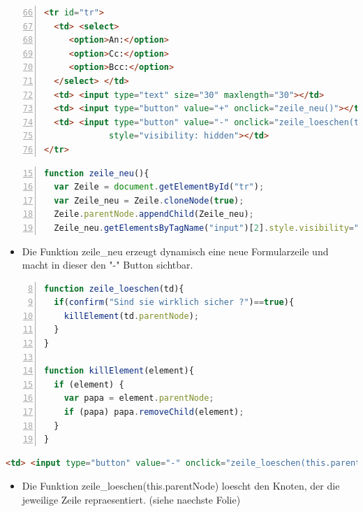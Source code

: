 \begin{frame}[<+->][fragile]
\tiny{ \begin{lstlisting}[language = HTML,
                                   mathescape = true, 
                   breaklines=true, 
                   numbers = left,
	        firstnumber=66 , 
                   numbersep = 3pt]
<tr id="tr">
  <td> <select>
     <option>An:</option>
     <option>Cc:</option>
     <option>Bcc:</option>
  </select> </td>
  <td> <input type="text" size="30" maxlength="30"></td>
  <td> <input type="button" value="+" onclick="zeile_neu()"></td>
  <td> <input type="button" value="-" onclick="zeile_loeschen(this.parentNode)" 
             style="visibility: hidden"></td>
</tr>
\end{lstlisting}}
\tiny{ \begin{lstlisting}[language=JavaScript, 
		   numbers=left,
		   numbersep=3pt,
		   firstnumber= 15,
		   breaklines=true]
function zeile_neu(){
  var Zeile = document.getElementById("tr");
  var Zeile_neu = Zeile.cloneNode(true);
  Zeile.parentNode.appendChild(Zeile_neu);
  Zeile_neu.getElementsByTagName("input")[2].style.visibility="visible";}
\end{lstlisting}}
\normalsize{
\begin{itemize}
\item Die Funktion zeile\_neu erzeugt dynamisch eine neue Formularzeile und macht in dieser den "-" Button sichtbar.
\end{itemize}
}
\end{frame}
\begin{frame}[<+->][fragile]
\tiny{ \begin{lstlisting}[language=JavaScript, 
		   numbers=left,
		   numbersep=3pt,
		   firstnumber= 8,
		   breaklines=true]
function zeile_loeschen(td){
  if(confirm("Sind sie wirklich sicher ?")==true){
    killElement(td.parentNode);
  }
}

function killElement(element){
  if (element) {
    var papa = element.parentNode;
    if (papa) papa.removeChild(element);
  }
}

\end{lstlisting}}
\tiny{ \begin{lstlisting}[language = HTML,
                                   mathescape = true, 
                   breaklines=true,  
                   numbersep = 3pt]
<td> <input type="button" value="-" onclick="zeile_loeschen(this.parentNode)" style="visibility:visible"> </td>
\end{lstlisting}}
\normalsize
\begin{itemize}
\item Die Funktion zeile\_loeschen(this.parentNode) loescht den Knoten, der die jeweilige Zeile repraesentiert. (siehe naechste Folie) 
\end{itemize}
\end{frame}
